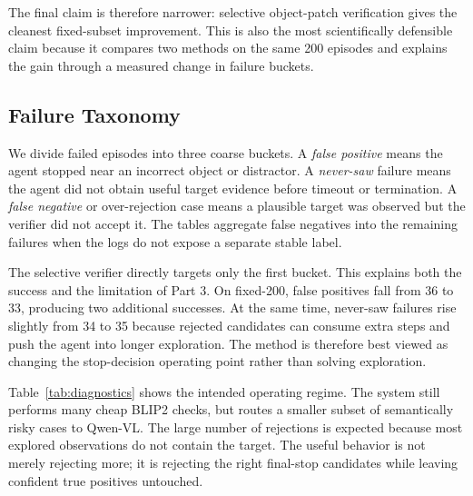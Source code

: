 \documentclass[10pt,twocolumn,letterpaper]{article}
\begin{document}
The final claim is therefore narrower: selective object-patch verification gives the cleanest fixed-subset improvement. This is also the most scientifically defensible claim because it compares two methods on the same 200 episodes and explains the gain through a measured change in failure buckets.

\subsection{Failure Taxonomy}
We divide failed episodes into three coarse buckets. A \emph{false positive} means the agent stopped near an incorrect object or distractor. A \emph{never-saw} failure means the agent did not obtain useful target evidence before timeout or termination. A \emph{false negative} or over-rejection case means a plausible target was observed but the verifier did not accept it. The tables aggregate false negatives into the remaining failures when the logs do not expose a separate stable label.

The selective verifier directly targets only the first bucket. This explains both the success and the limitation of Part 3. On fixed-200, false positives fall from 36 to 33, producing two additional successes. At the same time, never-saw failures rise slightly from 34 to 35 because rejected candidates can consume extra steps and push the agent into longer exploration. The method is therefore best viewed as changing the stop-decision operating point rather than solving exploration.

Table~\ref{tab:diagnostics} shows the intended operating regime. The system still performs many cheap BLIP2 checks, but routes a smaller subset of semantically risky cases to Qwen-VL. The large number of rejections is expected because most explored observations do not contain the target. The useful behavior is not merely rejecting more; it is rejecting the right final-stop candidates while leaving confident true positives untouched.
\end{document}
